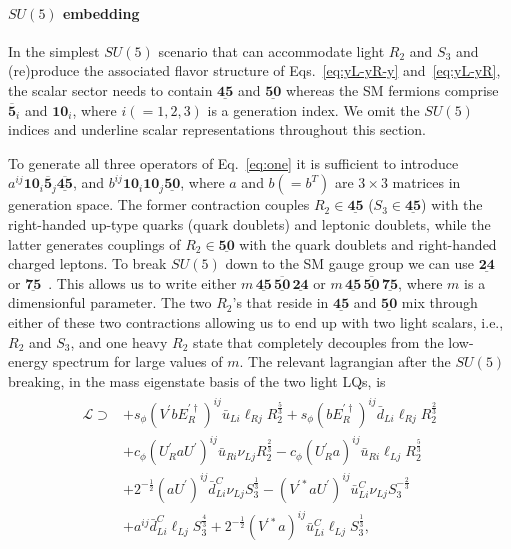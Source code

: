 \documentclass[aps,prd,superscriptaddress,twocolumn,secnumarabic]{revtex4-1}
\begin{document}
\paragraph*{$SU(5)$ embedding}
In the simplest $SU(5)$ scenario that can accommodate light $R_2$ and $S_3$ and (re)produce the associated flavor structure of Eqs.~\eqref{eq:yL-yR-y} and~\eqref{eq:yL-yR}, the scalar sector needs to contain $\underline{\bm{45}}$ and $ \underline{\bm{50}}$ whereas the SM fermions comprise $\overline{\bm{5}}_{i}$ and $\bm{10}_i$, where $i(=1,2,3)$ is a generation index. We omit the $SU(5)$ indices and underline scalar representations throughout this section.

To generate all three operators of Eq.~\eqref{eq:one} it is sufficient to introduce $a^{ij} \bm{10}_i \overline{\bm{5}}_j \overline{\underline{\bm{45}}}$, and $b^{ij} \bm{10}_i \bm{10}_j  \underline{\bm{50}}$, where $a$ and $b(=b^T)$ are $3 \times 3$ matrices in generation space. The former contraction couples $R_2 \in \underline{\bm{45}}$ ($S_3 \in \underline{\bm{45}}$) with the right-handed up-type quarks (quark doublets) and leptonic doublets, while the latter generates couplings of $R_2 \in \underline{\bm{50}}$ with the quark doublets and right-handed charged leptons. To break $SU(5)$ down to the SM gauge group we can use $\underline{\bm{24}}$~\cite{Georgi:1974sy} or $\underline{\bm{75}}$~\cite{Hubsch:1984pg,Hubsch:1984qi}. This allows us to write either $m\, \underline{\bm{45}} \, \overline{\underline{\bm{50}}} \, \underline{\bm{24}}$ or $m\, \underline{\bm{45}} \, \overline{\underline{\bm{50}}} \, \underline{\bm{75}}$, where $m$ is a dimensionful parameter. The two $R_2$'s that reside in $\underline{\bm{45}}$ and $\underline{\bm{50}}$ mix through either of these two contractions allowing us to end up with two light scalars, i.e., $R_2$ and $S_3$, and one heavy $R_2$ state that completely decouples from the low-energy spectrum for large values of $m$. The relevant lagrangian after the $SU(5)$ breaking, in the mass eigenstate basis of the two light LQs, is 
\begin{align}
\label{eq:three}
\begin{split}
\mathcal{L} \supset &+s_\phi (V^\prime b E_R^{\prime \dagger})^{ij} \bar{u}_{Li}\ell_{Rj}R_2^{\frac{5}{3}} + s_\phi (b E_R^{\prime \dagger})^{ij} \bar{d}_{Li}\ell_{Rj} R_2^{\frac{2}{3}}\\
& +c_\phi (U^\prime_R a U^\prime)^{ij} \bar{u}_{Ri} \nu_{Lj} R_2^{\frac{2}{3}}-c_\phi (U^\prime_R a)^{ij} \bar{u}_{Ri}\ell_{Lj} R_2^{\frac{5}{3}}\\
&+2^{-\frac{1}{2}} (a U^\prime)^{ij} \bar{d}^C_{Li} \nu_{Lj} S_3^{\frac{1}{3}}-(V^{\prime *} a U^\prime)^{ij} \bar{u}_{Li}^C \nu_{Lj} S_3^{-\frac{2}{3}} \\
&+ a^{ij} \bar{d}_{Li}^C \ell_{Lj} S_3^{\frac{4}{3}}+2^{-\frac{1}{2}} (V^{\prime *}  a)^{ij} \bar{u}^C_{Li} \ell_{Lj} S_3^{\frac{1}{3}},
\end{split} 
\end{align}
\end{document}
